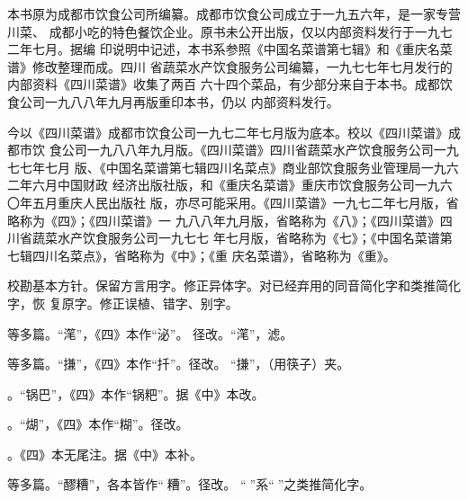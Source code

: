 \vspace{.6875\baselineskip}%
\begin{list}{}{%
	\setlength{\topsep}{0pt}%
	\setlength{\leftmargin}{1.5bp}%
	\setlength{\rightmargin}{1.5bp}%
	\setlength{\listparindent}{\parindent}%
	\setlength{\itemindent}{\parindent}%
	\setlength{\parsep}{\parskip}%
}%
\item[]%

本书原为成都市饮食公司所编纂。成都市饮食公司成立于一九五六年，是一家专营川菜、
成都小吃的特色餐饮企业。原书未公开出版，仅以内部资料发行于一九七二年七月。据编
印说明中记述，本书系参照《中国名菜谱第七辑》和《重庆名菜谱》修改整理而成。四川
省蔬菜水产饮食服务公司编纂，一九七七年七月发行的内部资料《四川菜谱》收集了两百
六十四个菜品，有少部分来自于本书。成都饮食公司一九八八年九月再版重印本书，仍以
内部资料发行。

今以《四川菜谱》成都市饮食公司一九七二年七月版为底本。校以《四川菜谱》成都市饮
食公司一九八八年九月版。《四川菜谱》四川省蔬菜水产饮食服务公司一九七七年七月
版、《中国名菜谱第七辑四川名菜点》商业部饮食服务业管理局一九六二年六月中国财政
经济出版社版，和《重庆名菜谱》重庆市饮食服务公司一九六〇年五月重庆人民出版社
版，亦尽可能采用。《四川菜谱》一九七二年七月版，省略称为《四》；《四川菜谱》一
九八八年九月版，省略称为《八》；《四川菜谱》四川省蔬菜水产饮食服务公司一九七七
年七月版，省略称为《七》；《中国名菜谱第七辑四川名菜点》，省略称为《中》；《重
庆名菜谱》，省略称为《重》。

校勘基本方针。保留方言用字。修正异体字。对已经弃用的同音简化字和类推简化字，恢
复原字。修正误植、错字、别字。

\vspace{.5\baselineskip plus .5\baselineskip minus .5\baselineskip}%
{\noindent\null\hfill{}\hfill\null}%
\vspace{1\baselineskip plus .5\baselineskip minus .5\baselineskip}%

等多篇。“滗”，《四》本作“泌”。
径改。“滗”，滤。

等多篇。“搛”，《四》本作“扦”。径改。
“搛”，（用筷子）夹。

。“锅巴”，《四》本作“锅粑”。据《中》本改。

。“煳”，《四》本作“糊”。径改。

。《四》本无尾注{\footnotesize{}}。据《中》本补。

等多篇。“醪糟”，各本皆作“𰪿糟”。径改。
“𰪿”系“𫃑”之类推简化字。


\end{list}
